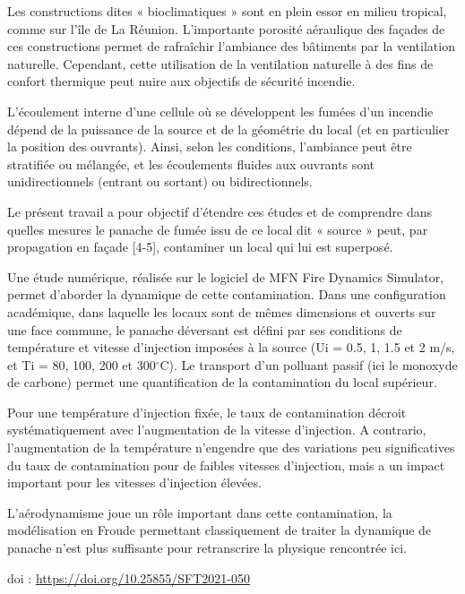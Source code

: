 {\normalsize
Les constructions dites « bioclimatiques » sont en plein essor en milieu tropical, comme sur l'île de La Réunion. L'importante porosité aéraulique des façades de ces constructions permet de rafraîchir l'ambiance des bâtiments par la ventilation naturelle. Cependant, cette utilisation de la ventilation naturelle à des fins de confort thermique peut nuire aux objectifs de sécurité incendie.



L'écoulement interne d'une cellule où se développent les fumées d'un incendie dépend de la puissance de la source et de la géométrie du local (et en particulier la position des ouvrants). Ainsi, selon les conditions, l'ambiance peut être stratifiée ou mélangée, et les écoulements fluides aux ouvrants sont unidirectionnels (entrant ou sortant) ou bidirectionnels.



Le présent travail a pour objectif d'étendre ces études et de comprendre dans quelles mesures le panache de fumée issu de ce local dit « source » peut, par propagation en façade [4-5], contaminer un local qui lui est superposé.



Une étude numérique, réalisée sur le logiciel de MFN Fire Dynamics Simulator, permet d'aborder la dynamique de cette contamination. Dans une configuration académique, dans laquelle les locaux sont de mêmes dimensions et ouverts sur une face commune, le panache déversant est défini par ses conditions de température et vitesse d'injection imposées à la source (Ui = 0.5, 1, 1.5 et 2 m/s, et Ti = 80, 100, 200 et 300$^{\circ}$C). Le transport d'un polluant passif (ici le monoxyde de carbone) permet une quantification de la contamination du local supérieur.



Pour une température d'injection fixée, le taux de contamination décroit systématiquement avec l'augmentation de la vitesse d'injection. A contrario, l'augmentation de la température n'engendre que des variations peu significatives du taux de contamination pour de faibles vitesses d'injection, mais a un impact important pour les vitesses d'injection élevées.



L'aérodynamisme joue un rôle important dans cette contamination, la modélisation en Froude permettant classiquement de traiter la dynamique de panache n'est plus suffisante pour retranscrire la physique rencontrée ici.

 \vfill doi : \url{https://doi.org/10.25855/SFT2021-050}

}
 
